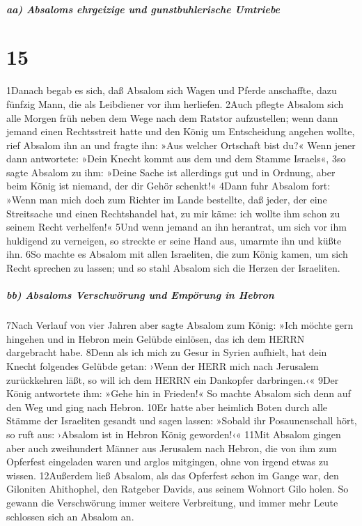 \hypertarget{aa-absaloms-ehrgeizige-und-gunstbuhlerische-umtriebe}{%
\subparagraph{aa) Absaloms ehrgeizige und gunstbuhlerische
Umtriebe}\label{aa-absaloms-ehrgeizige-und-gunstbuhlerische-umtriebe}}

\hypertarget{section-14}{%
\section{15}\label{section-14}}

1Danach begab es sich, daß Absalom sich Wagen und Pferde anschaffte,
dazu fünfzig Mann, die als Leibdiener vor ihm herliefen. 2Auch pflegte
Absalom sich alle Morgen früh neben dem Wege nach dem Ratstor
aufzustellen; wenn dann jemand einen Rechtsstreit hatte und den König um
Entscheidung angehen wollte, rief Absalom ihn an und fragte ihn: »Aus
welcher Ortschaft bist du?« Wenn jener dann antwortete: »Dein Knecht
kommt aus dem und dem Stamme Israels«, 3so sagte Absalom zu ihm: »Deine
Sache ist allerdings gut und in Ordnung, aber beim König ist niemand,
der dir Gehör schenkt!« 4Dann fuhr Absalom fort: »Wenn man mich doch zum
Richter im Lande bestellte, daß jeder, der eine Streitsache und einen
Rechtshandel hat, zu mir käme: ich wollte ihm schon zu seinem Recht
verhelfen!« 5Und wenn jemand an ihn herantrat, um sich vor ihm huldigend
zu verneigen, so streckte er seine Hand aus, umarmte ihn und küßte ihn.
6So machte es Absalom mit allen Israeliten, die zum König kamen, um sich
Recht sprechen zu lassen; und so stahl Absalom sich die Herzen der
Israeliten.

\hypertarget{bb-absaloms-verschwuxf6rung-und-empuxf6rung-in-hebron}{%
\subparagraph{bb) Absaloms Verschwörung und Empörung in
Hebron}\label{bb-absaloms-verschwuxf6rung-und-empuxf6rung-in-hebron}}

7Nach Verlauf von vier Jahren aber sagte Absalom zum König: »Ich möchte
gern hingehen und in Hebron mein Gelübde einlösen, das ich dem HERRN
dargebracht habe. 8Denn als ich mich zu Gesur in Syrien aufhielt, hat
dein Knecht folgendes Gelübde getan: ›Wenn der HERR mich nach Jerusalem
zurückkehren läßt, so will ich dem HERRN ein Dankopfer darbringen.‹«
9Der König antwortete ihm: »Gehe hin in Frieden!« So machte Absalom sich
denn auf den Weg und ging nach Hebron. 10Er hatte aber heimlich Boten
durch alle Stämme der Israeliten gesandt und sagen lassen: »Sobald ihr
Posaunenschall hört, so ruft aus: ›Absalom ist in Hebron König
geworden!‹« 11Mit Absalom gingen aber auch zweihundert Männer aus
Jerusalem nach Hebron, die von ihm zum Opferfest eingeladen waren und
arglos mitgingen, ohne von irgend etwas zu wissen. 12Außerdem ließ
Absalom, als das Opferfest schon im Gange war, den Giloniten Ahithophel,
den Ratgeber Davids, aus seinem Wohnort Gilo holen. So gewann die
Verschwörung immer weitere Verbreitung, und immer mehr Leute schlossen
sich an Absalom an.

